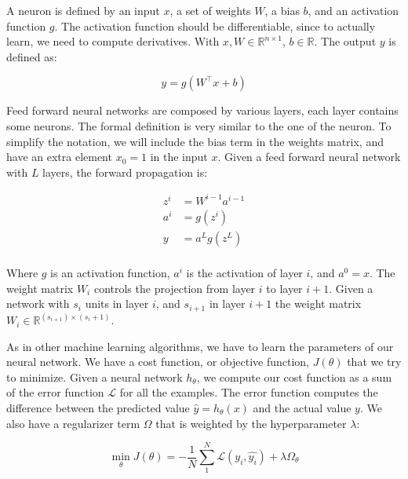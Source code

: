 A neuron is defined by an input $x$, a set of weights $W$, a bias $b$, and an activation function $g$. The activation function should be differentiable, since to actually learn, we need to compute derivatives. With $x, W \in \mathbb{R}^{n\times1}$, $b \in \mathbb{R}$. The output $y$ is defined as: 

\begin{equation}
    y = g(W^{\intercal} x + b)
\end{equation}


Feed forward neural networks are composed by various layers, each layer contains some neurons. The formal definition is very similar to the one of the neuron. To simplify the notation, we will include the bias term in the weights matrix, and have an extra element $x_0 = 1$ in the input $x$. Given a feed forward neural network with $L$ layers, the forward propagation is: 

\begin{equation}
\begin{split}
    z^i & = W^{i-1}a^{i-1} \\
    a^{i} & = g(z^i) \\
    y & = a^L g(z^L) \\
\end{split}
\end{equation}

Where $g$ is an activation function, $a^i$ is the activation of layer $i$, and $a^0 = x$. The weight matrix $W_i$ controls the projection from layer $i$ to layer $i+1$. Given a network with $s_i$ units in layer $i$, and $s_{i+1}$ in layer $i+1$ the weight matrix $W_i \in\mathbb{R}^{(s_{i+1})\times (s_i + 1)} $. 

As in other machine learning algorithms, we have to learn the parameters of our neural network. We have a cost function, or objective function, $J(\theta)$ that we try to minimize. Given a neural network $h_\theta$, we compute our cost function as a sum of the error function  $\mathcal{L}$ for all the examples. The error function computes the difference between the predicted value $\hat{y} = h_{\theta}(x)$ and the actual value $y$. We also have a regularizer term $\Omega$ that is weighted by the hyperparameter $\lambda$:

\begin{equation}
    \min_{\theta} J(\theta) = - \frac{1}{N} \sum_{1}^{N} \mathcal{L}(y_i, \hat{y_i}) + \lambda \Omega_\theta
\end{equation}


